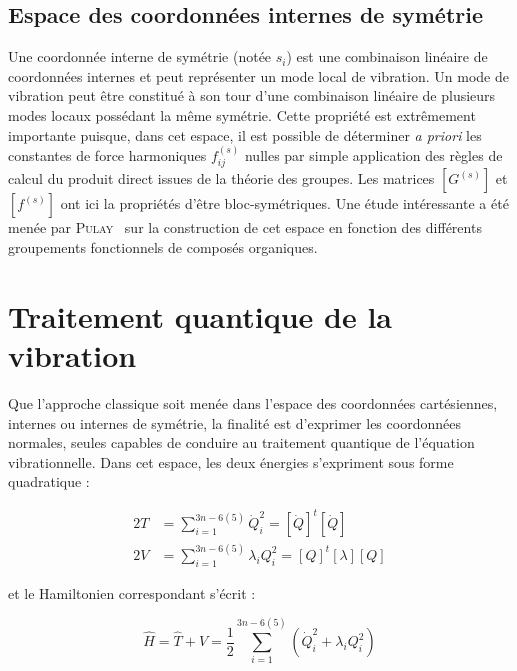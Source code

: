 \subsection{Espace des coordonnées internes de symétrie}

Une coordonnée interne de symétrie (notée $s_i$) est une combinaison linéaire de coordonnées internes et peut représenter un mode local de vibration. Un mode de vibration peut être constitué à son tour d'une combinaison linéaire de plusieurs modes locaux possédant la même symétrie. Cette propriété est extrêmement importante puisque, dans cet espace, il est possible de déterminer \textit{a priori} les constantes de force harmoniques $f^{(s)}_{ij}$ nulles par simple application des règles de calcul du produit direct issues de la théorie des groupes. Les matrices $\left[G^{(s)}\right]$ et $\left[f^{(s)}\right]$ ont ici la propriétés d'être bloc-symétriques. Une étude intéressante a été menée par \textsc{Pulay}~\cite{pulay1979systematic} sur la construction de cet espace en fonction des différents groupements fonctionnels de composés organiques.


\section{Traitement quantique de la vibration}

Que l'approche classique soit menée dans l'espace des coordonnées cartésiennes, internes ou internes de symétrie, la finalité est d'exprimer les coordonnées normales, seules capables de conduire au traitement quantique de l'équation vibrationnelle. Dans cet espace, les deux énergies s'expriment sous forme quadratique :

\begin{align}
	2T &= \sum^{3n-6(5)}_{i=1} \dot{Q}^2_i = \left[\dot{Q}\right]^t\left[\dot{Q}\right] \\
	2V &= \sum^{3n-6(5)}_{i=1} \lambda_i Q^2_i = \left[Q\right]^t\left[\lambda\right]\left[Q\right]
\end{align}

\noindent et le Hamiltonien correspondant s'écrit :

\begin{equation}
	\hat{H} = \hat{T} + \hat{V} = \frac{1}{2} \sum^{3n-6(5)}_{i=1} \left(\dot{Q}^2_i + \lambda_i Q^2_i\right)
\end{equation}

